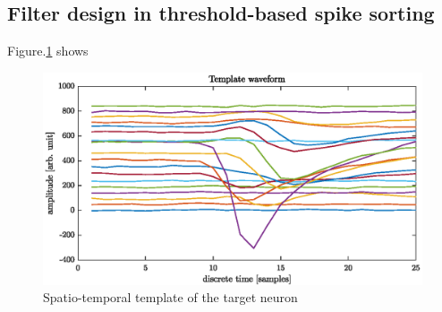 \documentclass[pagesize,english,DIV=calc,footinclude=false
]{scrartcl}
\begin{document}
\subsection{Filter design in threshold-based spike sorting}

Figure.\ref{fig:spike_template} shows 

\begin{figure}[htbp]
  \centering
  \includegraphics[width=0.7\linewidth]{template_spike.eps}
  \caption{Spatio-temporal template of the target neuron}
  \label{fig:spike_template}
\end{figure}
\end{document}
